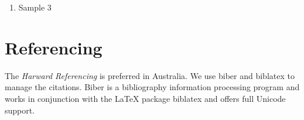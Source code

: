 \documentclass[a4paper,10pt]{article}
\begin{document}
\begin{enumerate}
  \newpage\item Sample 3
  \newline
  \newline
\end{enumerate}

\section{Referencing}
The \textit{Harward Referencing} is preferred in Australia.
\newline We use \textsf{biber} and \textsf{biblatex} to manage the citations.
\newline Biber is a bibliography information processing program and works in conjunction with the LaTeX package biblatex and offers full Unicode support. \autocite{BiberWiki}
\end{document}
